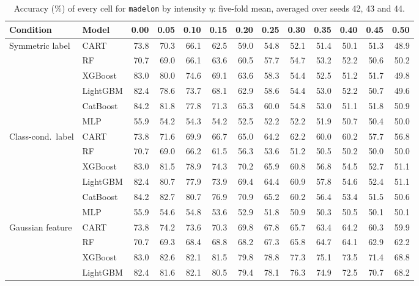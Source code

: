 \documentclass[pdflatex,sn-mathphys]{sn-jnl}
\theoremstyle{thmstyleone}
\begin{document}
\begin{table}[htbp]
\centering
\tiny
\setlength{\tabcolsep}{2.6pt}
\caption{Accuracy (\%) of every cell for \texttt{madelon} by intensity $\eta$: five-fold mean, averaged over seeds 42, 43 and 44.}
\label{tab:grid_madelon}
\begin{tabular}{@{}llrrrrrrrrrrr@{}}
\toprule
Condition & Model & 0.00 & 0.05 & 0.10 & 0.15 & 0.20 & 0.25 & 0.30 & 0.35 & 0.40 & 0.45 & 0.50 \\
\midrule
Symmetric label & CART & 73.8 & 70.3 & 66.1 & 62.5 & 59.0 & 54.8 & 52.1 & 51.4 & 50.1 & 51.3 & 48.9 \\
 & RF & 70.7 & 69.0 & 66.1 & 63.6 & 60.5 & 57.7 & 54.7 & 53.2 & 52.2 & 50.6 & 50.2 \\
 & XGBoost & 83.0 & 80.0 & 74.6 & 69.1 & 63.6 & 58.3 & 54.4 & 52.5 & 51.2 & 51.7 & 49.8 \\
 & LightGBM & 82.4 & 78.6 & 73.7 & 68.1 & 62.9 & 58.6 & 54.4 & 53.0 & 52.2 & 50.7 & 49.6 \\
 & CatBoost & 84.2 & 81.8 & 77.8 & 71.3 & 65.3 & 60.0 & 54.8 & 53.0 & 51.1 & 51.8 & 50.9 \\
 & MLP & 55.9 & 54.2 & 54.3 & 54.2 & 52.5 & 52.2 & 52.2 & 51.9 & 50.7 & 50.4 & 50.0 \\
\midrule
Class-cond.\ label & CART & 73.8 & 71.6 & 69.9 & 66.7 & 65.0 & 64.2 & 62.2 & 60.0 & 60.2 & 57.7 & 56.8 \\
 & RF & 70.7 & 69.0 & 66.2 & 61.5 & 56.3 & 53.6 & 51.2 & 50.5 & 50.2 & 50.0 & 50.0 \\
 & XGBoost & 83.0 & 81.5 & 78.9 & 74.3 & 70.2 & 65.9 & 60.8 & 56.8 & 54.5 & 52.7 & 51.1 \\
 & LightGBM & 82.4 & 80.7 & 77.9 & 73.9 & 69.4 & 64.4 & 60.9 & 57.8 & 54.6 & 52.4 & 51.1 \\
 & CatBoost & 84.2 & 82.7 & 80.7 & 76.9 & 70.9 & 65.2 & 60.2 & 56.4 & 53.4 & 51.5 & 50.6 \\
 & MLP & 55.9 & 54.6 & 54.8 & 53.6 & 52.9 & 51.8 & 50.9 & 50.3 & 50.5 & 50.1 & 50.1 \\
\midrule
Gaussian feature & CART & 73.8 & 74.2 & 73.6 & 70.3 & 69.8 & 67.8 & 65.7 & 63.4 & 64.2 & 60.3 & 59.9 \\
 & RF & 70.7 & 69.3 & 68.4 & 68.8 & 68.2 & 67.3 & 65.8 & 64.7 & 64.1 & 62.9 & 62.2 \\
 & XGBoost & 83.0 & 82.6 & 82.1 & 81.5 & 79.8 & 78.8 & 77.3 & 75.1 & 73.5 & 71.4 & 68.8 \\
 & LightGBM & 82.4 & 81.6 & 82.1 & 80.5 & 79.4 & 78.1 & 76.3 & 74.9 & 72.5 & 70.7 & 68.2 \\

\end{tabular}
\end{table}
\end{document}
